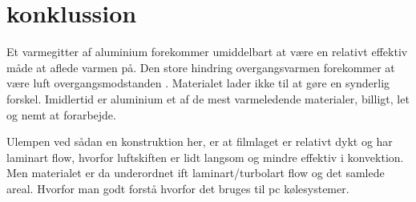 \section{konklussion}

Et varmegitter af aluminium forekommer umiddelbart at være en relativt effektiv måde at aflede varmen på. 
Den store hindring overgangsvarmen forekommer at være luft overgangsmodstanden . 
Materialet lader ikke til at gøre en synderlig forskel. 
Imidlertid er aluminium et af de mest varmeledende materialer, billigt, let og nemt at forarbejde.

Ulempen ved sådan en konstruktion her, er at filmlaget er relativt dykt og har laminart flow, hvorfor luftskiften er lidt langsom og mindre effektiv i konvektion. 
Men materialet er da underordnet ift laminart/turbolart flow og det samlede areal. 
Hvorfor man godt forstå hvorfor det bruges til pc kølesystemer. 